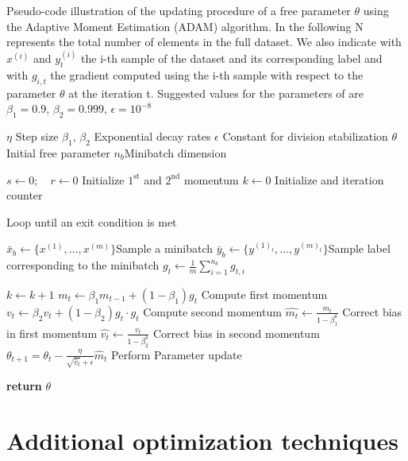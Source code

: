 \begin{algorithm}[H]
\caption{Pseudo-code illustration of the updating procedure of a free parameter $\theta$ using the Adaptive Moment Estimation (ADAM) algorithm. In the following N represents the total number of elements in the full dataset. We also indicate with $x^{(i)}$ and $y^{(i)}_t$ the i-th sample of the dataset and its corresponding label and with $g_{i,t}$ the gradient computed using the i-th sample with respect to the parameter $\theta$ at the iteration t. Suggested values for the parameters of are $\beta_1=0.9,\,\beta_2=0.999,\,\epsilon=10^{-8}$}\label{alg:adam}
\begin{algorithmic}[1]
\Require $\eta$ \Comment Step size
\Require $ \beta_1,\,\beta_2$ \Comment Exponential decay rates 
\Require $\epsilon$ \Comment Constant for division stabilization
\Require ${\theta}$ \Comment Initial free parameter
\Require $n_b$\Comment Minibatch dimension 

\State $s\gets 0;\quad r\gets 0$ \Comment Initialize $1^\text{st}$ and $2^\text{nd}$ momentum 
\State $k\gets 0$ \Comment Initialize and iteration counter

 \Comment Loop until an exit condition is met

\State $\bar{x}_b \gets \{x^{(1)},\dots,x^{(m)}\}$\Comment Sample a minibatch
\State $\bar{y}_b \gets \{y^{(1)_t},\dots,y^{(m)_t}\}$\Comment Sample label corresponding to the minibatch
\State ${g}_t \gets  \frac{1}{m} \sum_{i=1}^{n_b} g_{t,i}$ 

\State $k \gets k+1$
\State $m_t \gets \beta_1 m_{t-1} + (1-\beta_1) g_t$    \Comment Compute first momentum
\State $v_t \gets \beta_2 v_t + (1-\beta_2) g_t \cdot g_t$    \Comment Compute second momentum
\State $\hat{m_t} \gets \frac{m_t}{1 - \beta^k_1}$   \Comment Correct bias in first momentum
\State $\hat{v_t} \gets \frac{v_t}{1 - \beta^k_2}$   \Comment Correct bias in second momentum
\State $\theta_{t+1}=\theta_{t}-\frac{\eta}{\sqrt{\hat{v}_{t}}+\epsilon} \hat{m}_{t}$
\Comment Perform Parameter update
\EndWhile

\State \textbf{return} ${\theta}$
\EndProcedure
\end{algorithmic}
\end{algorithm}

\newpage
\section{Additional optimization techniques} \label{opt_tec}

